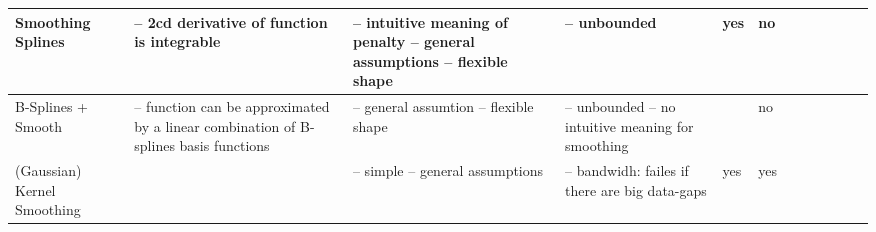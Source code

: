 \begin{table}[!ht]
\begin{tabular}{p{1.6cm}p{3.3cm}p{3.3cm}p{3.3cm}p{0.4cm}p{0.4cm}p{3cm}p{3cm}p{3cm}p{3cm}p{3cm}p{3cm}|}
    Smoothing Splines                                                                     &
    -- 2cd derivative of function is integrable                                           &
    -- intuitive meaning of penalty -- general assumptions -- flexible shape              &
    -- unbounded                                                                          &
    yes                                                                                   &
    no                                                                                          \\ \hline%

    B-Splines + Smooth                                                                    &
    -- function can be approximated by a linear combination of B-splines basis functions  &
    -- general assumtion -- flexible shape                                                &
    -- unbounded -- no intuitive meaning for smoothing                                    &
    ~                                                                                     &
    no                                                                                          \\ \hline%



    (Gaussian) Kernel Smoothing                                                           &
    ~                                                                                     &
    -- simple -- general assumptions                                                      &
    -- bandwidh: failes if there are big data-gaps                                        &
    yes                                                                                   &
    yes                                                                                         \\ \hline%


\end{tabular}
\end{table}
